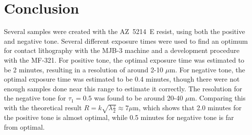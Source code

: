 \section*{Conclusion}
Several samples were created with the AZ~5214~E resist, using both the positive and negative tone. Several different exposure times were used to find an optimum for contact lithography with the MJB-3 machine and a development procedure with the MF-321. For positive tone, the optimal exposure time was estimated to be 2 minutes, resulting in a resolution of around 2-10 $\mu$m. For negative tone, the optimal exposure time was estimated to be 0.4 minutes, though there were not enough samples done near this range to estimate it correctly. The resolution for the negative tone for $\tau_1 = 0.5$ was found to be around 20-40 $\mu$m. Comparing this with the theoretical result $R = k \sqrt{\lambda\frac{z}{2}} \approx 7 \mu$m, which shows that 2.0 minutes for the positive tone is almost optimal, while 0.5 minutes for negative tone is far from optimal.

